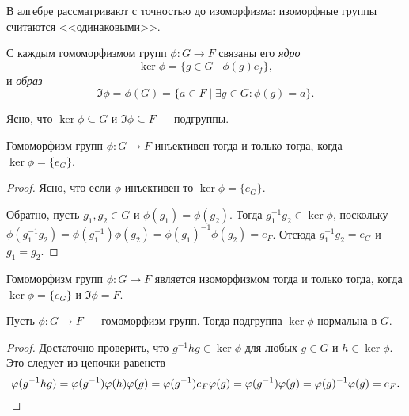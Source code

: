 В алгебре рассматривают с точностью до изоморфизма: изоморфные группы считаются <<одинаковыми>>.

\begin{definition}
    С каждым гомоморфизмом групп $\phi \colon G \to F$ связаны его \textit{ядро}
    \begin{equation*}
        \ker \phi = \{g \in G \mid \phi(g) e_f\}
    ,\end{equation*}
    и \textit{образ}
    \begin{equation*}
        \Im \phi = \phi(G) = \{a \in F \mid \exists g \in G : \phi(g) = a\}
    .\end{equation*}
\end{definition}

Ясно, что $\ker \phi \subseteq G$ и $\Im \phi \subseteq F$ --- подгруппы.

\begin{lemma}
    Гомоморфизм групп $\phi \colon G \to F$ инъективен тогда и только тогда, когда $\ker \phi = \{e_G\}$.
\end{lemma}

\begin{proof}
    Ясно, что если $\phi$ инъективен то $\ker \phi = \{e_G\}$.

    Обратно, пусть $g_1, g_2 \in G$ и $\phi(g_1) = \phi(g_2)$. Тогда $g_1^{-1} g_2 \in \ker \phi$, поскольку $\phi(g_1^{-1} g_2) = \phi(g_1^{-1}) \phi(g_2) = \phi(g_1)^{-1} \phi(g_2) = e_F$. Отсюда $g_1^{-1} g_2 = e_G$ и $g_1 = g_2$.
\end{proof}

\begin{corollary}
    Гомоморфизм групп $\phi \colon G \to F$ является изоморфизмом тогда и только тогда, когда $\ker \phi = \{e_G\}$ и $\Im \phi = F$.
\end{corollary}

\begin{proposal}
    Пусть $\phi \colon G \to F$ --- гомоморфизм групп. Тогда подгруппа $\ker \phi$ нормальна в $G$.
\end{proposal}

\begin{proof}
    Достаточно проверить, что $g^{-1} h g \in \ker \phi$ для любых $g \in G$ и $h \in \ker \phi$. Это следует из цепочки равенств
    \begin{equation*}
        \phi(g^{-1} h g) = \phi(g^{-1}) \phi(h) \phi(g) = \phi(g^{-1}) e_F \phi(g) = \phi(g^{-1}) \phi(g) = \phi(g)^{-1} \phi(g) = e_F
    .\qedhere\end{equation*}
\end{proof}
